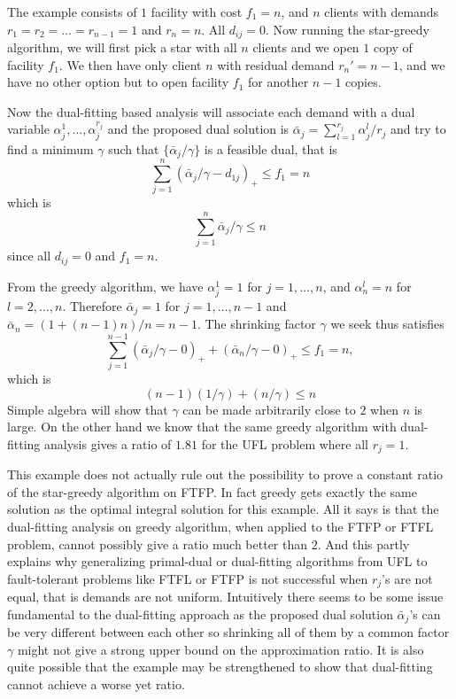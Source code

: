 \documentclass[11pt]{article}
\begin{document}
The example consists of $1$ facility with cost $f_1 = n$, and $n$
clients with demands $r_1=r_2=\ldots=r_{n-1} = 1$ and $r_n = n$. All
$d_{ij} = 0$. Now running the star-greedy algorithm, we will first
pick a star with all $n$ clients and we open $1$ copy of facility
$f_1$. We then have only client $n$ with residual demand $r_n' = n-1$,
and we have no other option but to open facility $f_1$ for another
$n-1$ copies.

Now the dual-fitting based analysis will associate each demand with a
dual variable $\alpha_j^1, \ldots, \alpha_j^{r_j}$ and the proposed
dual solution is $\bar\alpha_j = \sum_{l=1}^{r_j} \alpha_j^{l} / r_j$
and try to find a minimum $\gamma$ such that $\{\bar\alpha_j/\gamma\}$
is a feasible dual, that is
\begin{equation}
  \sum_{j=1}^n (\bar\alpha_j/\gamma - d_{1j})_+ \leq f_1 = n
\end{equation}
which is
\begin{equation}
  \sum_{j=1}^n \bar\alpha_j/\gamma  \leq n
\end{equation}
since all $d_{ij}=0$ and $f_1 = n$.

From the greedy algorithm, we have $\alpha_j^1 = 1$ for
$j=1,\ldots,n$, and $\alpha_n^l = n$ for $l=2,\ldots,n$. Therefore
$\bar\alpha_j = 1$ for $j=1,\ldots,n-1$ and $\bar\alpha_n =
(1+(n-1)n)/n = n-1$. The shrinking factor $\gamma$ we seek thus
satisfies
\begin{equation}
  \sum_{j=1}^{n-1} (\bar\alpha_j/\gamma - 0)_+ + (\bar\alpha_n/\gamma -0)_+
  \leq f_1 = n,
\end{equation}
which is
\begin{equation}
  (n-1)(1/\gamma)  + (n/\gamma) \leq n
\end{equation}
Simple algebra will show that $\gamma$ can be made arbitrarily close
to $2$ when $n$ is large. On the other hand we know that the same
greedy algorithm with dual-fitting analysis gives a ratio of $1.81$
for the UFL problem where all $r_j=1$.

This example does not actually rule out the possibility to prove a
constant ratio of the star-greedy algorithm on FTFP. In fact greedy
gets exactly the same solution as the optimal integral solution for
this example. All it says is that the dual-fitting analysis on greedy
algorithm, when applied to the FTFP or FTFL problem, cannot possibly
give a ratio much better than $2$. And this partly explains why
generalizing primal-dual or dual-fitting algorithms from UFL to
fault-tolerant problems like FTFL or FTFP is not successful when
$r_j$'s are not equal, that is demands are not uniform. Intuitively
there seems to be some issue fundamental to the dual-fitting approach
as the proposed dual solution $\bar\alpha_j$'s can be very different
between each other so shrinking all of them by a common factor
$\gamma$ might not give a strong upper bound on the approximation
ratio. It is also quite possible that the example may be strengthened
to show that dual-fitting cannot achieve a worse yet ratio.
\end{document}
